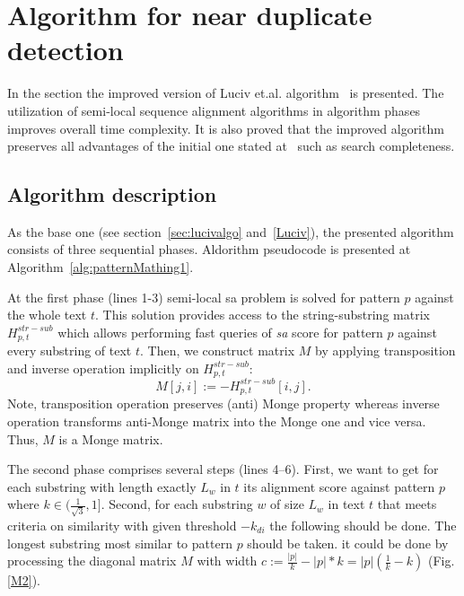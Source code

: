 \section{Algorithm for near duplicate detection}
\label{section:luciv}

In the section the improved version of Luciv et.al. algorithm~\cite{luciv2019interactive} is presented.
The utilization of semi-local sequence alignment algorithms in algorithm phases improves overall time complexity.
It is also proved that the improved algorithm preserves all advantages of the initial one stated at~\cite{luciv2019interactive} such as search completeness.

\subsection{Algorithm description}
As the base one (see section~\ref{sec:lucivalgo} and~\ref{Luciv}), the presented algorithm consists of three sequential phases.
Aldorithm pseudocode is presented at Algorithm~\ref{alg:patternMathing1}.

At the first phase (lines 1-3) semi-local sa problem is solved for pattern $p$ against the whole text $t$.
This solution provides access to the string-substring matrix $H^{str-sub}_{p,t}$ which allows performing fast queries of \emph{sa} score for pattern $p$ against every substring of text $t$.
Then, we construct matrix $M$ by applying transposition and inverse operation implicitly on $H^{str-sub}_{p,t}$:
$$M[j,i]:= -H^{str-sub}_{p,t}[i,j].$$
Note, transposition operation preserves (anti) Monge property whereas inverse operation transforms anti-Monge matrix into the Monge one and vice versa. 
Thus, $M$ is a Monge matrix.

The second phase comprises several steps (lines 4--6).
First, we want to get for each substring with length exactly $L_{w}$ in  $t$ its alignment score against pattern $p$ where $k \in (\frac{1}{\sqrt{3}},1]$.
Second, for each substring $w$ of size $L_{w}$ in text $t$ that meets criteria on similarity with given threshold $-k_{di}$ the following should be done.
The longest substring  most similar to pattern $p$ should be taken.
it could be done by processing the diagonal 
matrix $M$ with width $c:= \frac{|p|}{k} - |p|*k = |p|(\frac{1}{k} - k)$ (Fig. \ref{M2}).

